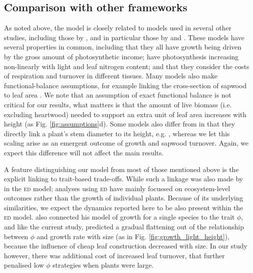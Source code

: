 \documentclass[a4paper,11pt]{article}
\begin{document}
\subsection{Comparison with other frameworks}

As noted above, the {\plant} model is closely related to models used in several other studies, including those by \citet{Givnish-1988, Yokozawa-1995, Makela-1997, King-1999, King-2005, Moorcroft-2001, Li-2014}, and in particular those by \citet{Makela-1997} and \citet{Moorcroft-2001}. These models have several properties in common, including that they all have growth being driven by the gross amount of photosynthetic income; have photosynthesis increasing non-linearly with light and leaf nitrogen content; and that they consider the costs of respiration and turnover in different tissues. Many models also make functional-balance assumptions, for example linking the cross-section of sapwood to leaf area \citep{Givnish-1988, Yokozawa-1995, Makela-1997, King-2005, Moorcroft-2001}. We note that an assumption of exact functional balance is not critical for our results, what matters is that the amount of live biomass (i.e. excluding heartwood) needed to support an extra unit of leaf area increases with height (as Fig. \ref{fig:assumptions}d). Some models also differ from in that they directly link a plant's stem diameter to its height, e.g. \citet{Yokozawa-1995, King-1999, Moorcroft-2001, Li-2014}, whereas we let this scaling arise as an emergent outcome of growth and sapwood turnover. Again, we expect this difference will not affect the main results.

A feature distinguishing our model from most of those mentioned above is the explicit linking to trait-based trade-offs. While such a linkage was also made by \citet{Moorcroft-2001} in the \textsc{ed} model; analyses using \textsc{ed} have mainly focussed on ecosystem-level outcomes rather than the growth of individual plants. Because of its underlying similarities, we expect the dynamics reported here to be also present within the \textsc{ed} model. \citet{King-1999} also connected his model of growth for a single species to the trait $\phi$, and like the current study, predicted a gradual flattening out of the relationship between $\phi$ and growth rate with size (as in Fig. \ref{fig:growth_light_height}), because the influence of cheap leaf construction decreased with size. In our study however, there was additional cost of increased leaf turnover, that further penalised low $\phi$ strategies when plants were large.
\end{document}
